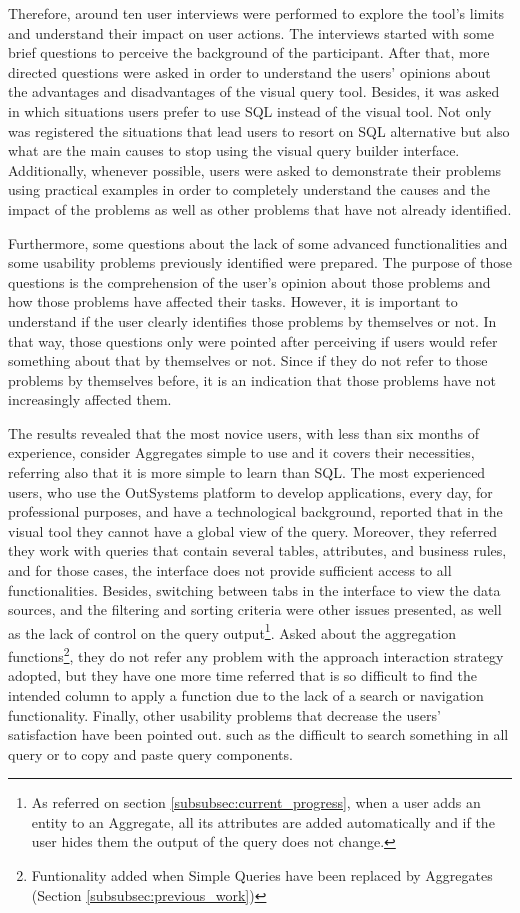 Therefore, around ten user interviews were performed to explore the tool's limits and understand their impact on user actions. The interviews started with some brief questions to perceive the background of the participant. After that, more directed questions were asked in order to understand the users' opinions about the advantages and disadvantages of the visual query tool. Besides, it was asked in which situations users prefer to use \gls{SQL} instead of the visual tool. Not only was registered the situations that lead users to resort on \gls{SQL} alternative but also what are the main causes to stop using the visual query builder interface. Additionally, whenever possible, users were asked to demonstrate their problems using practical examples in order to completely understand the causes and the impact of the problems as well as other problems that have not already identified.

Furthermore, some questions about the lack of some advanced functionalities and some usability problems previously identified were prepared. The purpose of those questions is the comprehension of the user's opinion about those problems and how those problems have affected their tasks. However, it is important to understand if the user clearly identifies those problems by themselves or not. In that way, those questions only were pointed after perceiving if users would refer something about that by themselves or not. Since if they do not refer to those problems by themselves before, it is an indication that those problems have not increasingly affected them.

The results revealed that the most novice users, with less than six months of experience, consider Aggregates simple to use and it covers their necessities, referring also that it is more simple to learn than \gls{SQL}. The most experienced users, who use the OutSystems platform to develop applications, every day, for professional purposes, and have a technological background, reported that in the visual tool they cannot have a global view of the query. Moreover, they referred they work with queries that contain several tables, attributes, and business rules, and for those cases, the interface does not provide sufficient access to all functionalities.  Besides, switching between tabs in the interface to view the data sources, and the filtering and sorting criteria were other issues presented, as well as the lack of control on the query output\footnote{As referred on section \ref{subsubsec:current_progress}, when a user adds an entity to an Aggregate, all its attributes are added automatically and if the user hides them the output of the query does not change.}. Asked about the aggregation functions\footnote{Funtionality added when Simple Queries have been replaced by Aggregates (Section \ref{subsubsec:previous_work})}, they do not refer any problem with the approach interaction strategy adopted, but they have one more time referred that is so difficult to find the intended column to apply a function due to the lack of a search or navigation functionality. Finally, other usability problems that decrease the users’ satisfaction have been pointed out. such as the difficult to search something in all query or to copy and paste query components.

